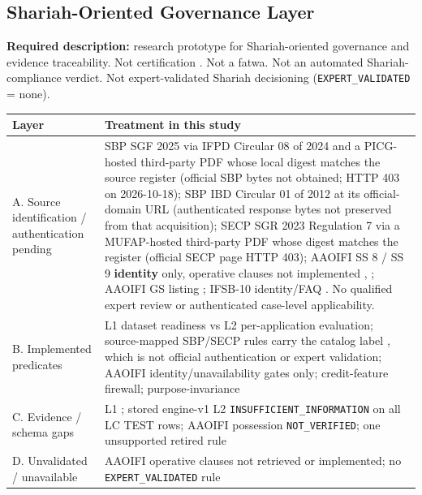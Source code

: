 \documentclass{ieeeaccess}
\makeatletter
\DeclareRobustCommand{\sha}[1]{{\ttfamily\expandafter\@shaloop\detokenize{#1}\relax}}
\def\@shaloop#1{%
  \ifx\relax#1\else#1\allowbreak\expandafter\@shaloop\fi}
\makeatother
\begin{document}
\subsection{Shariah-Oriented Governance Layer}

\textbf{Required description:} research prototype for Shariah-oriented governance and evidence traceability. Not certification \cite{b27}. Not a fatwa. Not an automated Shariah-compliance verdict. Not expert-validated Shariah decisioning (\texttt{EXPERT\_VALIDATED} = none).

\begin{center}
\footnotesize
\setlength{\tabcolsep}{3pt}
\begin{tabularx}{\columnwidth}{|>{\raggedright\arraybackslash}p{}|>{\raggedright\arraybackslash}X|}
\hline
Layer & Treatment in this study \\
\hline
A. Source identification / authentication pending & SBP SGF 2025 via IFPD Circular 08 of 2024 \cite{b24} and a PICG-hosted third-party PDF \cite{b25} whose local digest matches the source register (official SBP bytes not obtained; HTTP 403 on 2026-10-18); SBP IBD Circular 01 of 2012 at its official-domain URL \cite{b26} (authenticated response bytes not preserved from that acquisition); SECP SGR 2023 Regulation 7 via a MUFAP-hosted third-party PDF \cite{b27} whose digest matches the register (official SECP page HTTP 403); AAOIFI SS 8 / SS 9 \textbf{identity} only, operative clauses not implemented \cite{b28}, \cite{b29}; AAOIFI GS listing \cite{b30}; IFSB-10 identity/FAQ \cite{b31}. No qualified expert review or authenticated case-level applicability. \\
\hline
B. Implemented predicates & L1 dataset readiness vs L2 per-application evaluation; source-mapped SBP/SECP rules carry the catalog label \sha{SOURCE_VERIFIED_PENDING_EXPERT_REVIEW}, which is not official authentication or expert validation; AAOIFI identity/unavailability gates only; credit-feature firewall; purpose-invariance \\
\hline
C. Evidence / schema gaps & L1 \sha{INSUFFICIENT_SCHEMA_FOR_APPLICANT_DETERMINATION}; stored engine-v1 L2 \texttt{INSUFFICIENT\_INFORMATION} on all LC TEST rows; AAOIFI possession \texttt{NOT\_VERIFIED}; one unsupported retired rule \\
\hline
D. Unvalidated / unavailable & AAOIFI operative clauses not retrieved or implemented; no \texttt{EXPERT\_VALIDATED} rule \\
\hline
\end{tabularx}
\end{center}
\end{document}
